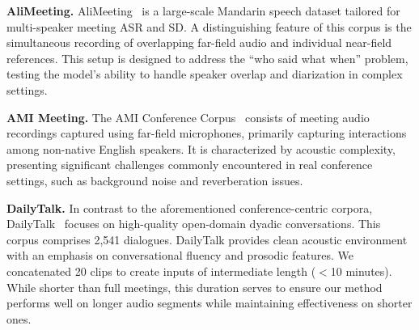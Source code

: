 \documentclass[11pt]{article}
\begin{document}
\textbf{AliMeeting.} 
AliMeeting~\cite{alimeeting, alimeeting2} is a large-scale Mandarin speech dataset tailored for multi-speaker meeting ASR and SD. A distinguishing feature of this corpus is the simultaneous recording of overlapping far-field audio and individual near-field references. This setup is designed to address the ``who said what when'' problem, testing the model's ability to handle speaker overlap and diarization in complex settings.

\textbf{AMI Meeting.} 
The AMI Conference Corpus~\cite{jain2024insectidentificationwildami} consists of meeting audio recordings captured using far-field microphones, primarily capturing interactions among non-native English speakers. It is characterized by acoustic complexity, presenting significant challenges commonly encountered in real conference settings, such as background noise and reverberation issues.

\textbf{DailyTalk.} 
In contrast to the aforementioned conference-centric corpora, DailyTalk~\cite{lee2022dailytalk} focuses on high-quality open-domain dyadic conversations. This corpus comprises 2,541 dialogues. DailyTalk provides clean acoustic environment with an emphasis on conversational fluency and prosodic features. We concatenated 20 clips to create inputs of intermediate length ($<$10 minutes). While shorter than full meetings, this duration serves to ensure our method performs well on longer audio segments while maintaining effectiveness on shorter ones.
\end{document}
